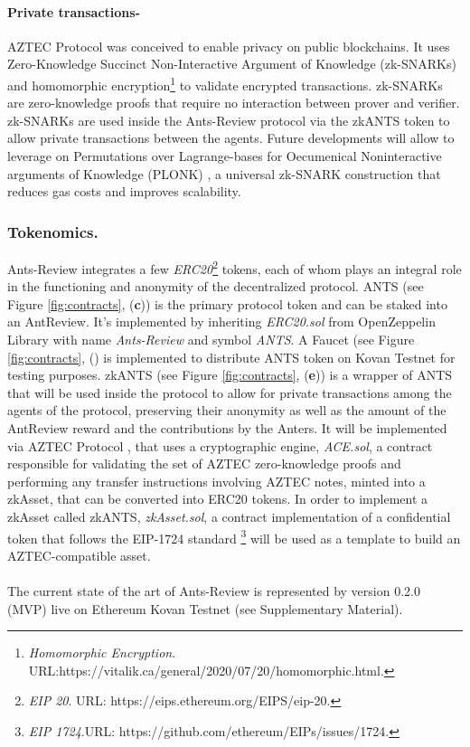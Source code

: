 \documentclass[runningheads]{llncs}
\begin{document}
\paragraph{\textbf{Private transactions}-}AZTEC Protocol was conceived to enable privacy on public blockchains. It uses Zero-Knowledge Succinct Non-Interactive Argument of Knowledge (zk-SNARKs)\cite{zSNARK} and homomorphic encryption\footnote[12]{\emph{Homomorphic Encryption}. \textsc{URL:}\newline https://vitalik.ca/general/2020/07/20/homomorphic.html.} to validate encrypted transactions. zk-SNARKs are zero-knowledge proofs that require no interaction between prover and verifier. zk-SNARKs are used inside the Ants-Review protocol via the zkANTS token to allow private transactions between the agents. Future developments will allow to leverage on Permutations over Lagrange-bases for Oecumenical Noninteractive arguments of Knowledge (PLONK) \cite{PLONK}, 
a universal zk-SNARK construction that reduces gas costs and improves scalability.

\subsubsection{Tokenomics.}
Ants-Review integrates a few \emph{ERC20}\footnote[13]{\emph{EIP 20}. \textsc{URL:} https://eips.ethereum.org/EIPS/eip-20.} tokens, each of whom plays an integral role in the functioning and anonymity of the decentralized protocol.
\newline ANTS (see Figure \ref{fig:contracts}, (\textbf{c})) is the primary protocol token and can be staked into an AntReview. It's implemented by inheriting \emph{ERC20.sol} from OpenZeppelin Library with name \emph{Ants-Review} and symbol \emph{ANTS}.
A Faucet (see Figure \ref{fig:contracts}, () is implemented to distribute ANTS token on Kovan Testnet for testing purposes. \newline zkANTS (see Figure \ref{fig:contracts}, (\textbf{e})) is a wrapper of ANTS that will be used inside the protocol to allow for private transactions among the agents of the protocol, preserving their anonymity as well as the amount of the AntReview reward and the contributions by the Anters. It will be implemented via AZTEC Protocol \cite{AZTEC}, that uses a cryptographic engine, \emph{ACE.sol}, a contract responsible for validating the set of AZTEC zero-knowledge proofs and performing any transfer instructions involving AZTEC notes, minted into a zkAsset, that can be converted into ERC20 tokens. In order to implement a zkAsset called zkANTS, \emph{zkAsset.sol}, a contract implementation of a confidential token that follows the EIP-1724 standard \footnote[14]{\emph{EIP  1724}.\textsc{URL:} https://github.com/ethereum/EIPs/issues/1724.} will be used as a template to build an AZTEC-compatible asset.
\\
\\ The current state of the art of Ants-Review is represented by version 0.2.0 (MVP) live on Ethereum Kovan Testnet (see Supplementary Material).
\end{document}
